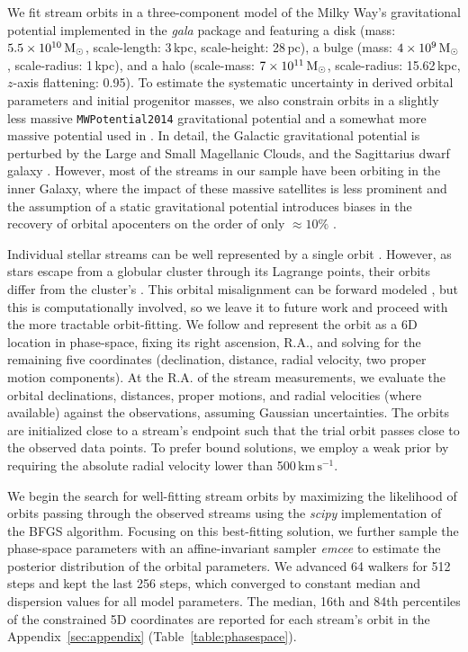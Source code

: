 \documentclass[twocolumn]{aastex63}
\newcommand{\package}[1]{\textsl{#1}}
\newcommand{\kms}{\ensuremath{\textrm{km}\,\textrm{s}^{-1}}}
\begin{document}
We fit stream orbits in a three-component model of the Milky Way's gravitational potential implemented in the \package{gala} package \citep{gala} and featuring a \citet{mn:1975} disk (mass: $5.5\times10^{10}\rm\, M_\odot$, scale-length: 3\,kpc, scale-height: 28\,pc), a \citet{hernquist:1990} bulge (mass: $4\times10^9\rm\, M_\odot$, scale-radius: 1\,kpc), and a \citet{nfw:1997} halo (scale-mass: $7\times10^{11}\rm\, M_\odot$, scale-radius: 15.62\,kpc, $z$-axis flattening: 0.95).
To estimate the systematic uncertainty in derived orbital parameters and initial progenitor masses, we also constrain orbits in a slightly less massive \texttt{MWPotential2014} gravitational potential \citep{bovy:2015} and a somewhat more massive potential used in \citet{pwb}.
In detail, the Galactic gravitational potential is perturbed by the Large and Small Magellanic Clouds, and the Sagittarius dwarf galaxy \citep{gomez:2015, erkal:2019, vasiliev:2020}.
However, most of the streams in our sample have been orbiting in the inner Galaxy, where the impact of these massive satellites is less prominent \citep{petersen:2020} and the assumption of a static gravitational potential introduces biases in the recovery of orbital apocenters on the order of only $\approx10\%$ \citep{garrow:2020}.


Individual stellar streams can be well represented by a single orbit \citep[e.g.,][]{koposov:2010, pwb, ibata:2019}.
However, as stars escape from a globular cluster through its Lagrange points, their orbits differ from the cluster's \citep{eyre:2011}.
This orbital misalignment can be forward modeled \citep{varghese:2011, bonaca:2014, sanders:2014}, but this is computationally involved, so we leave it to future work and proceed with the more tractable orbit-fitting.
We follow \citet{pwb} and represent the orbit as a 6D location in phase-space, fixing its right ascension, R.A., and solving for the remaining five coordinates (declination, distance, radial velocity, two proper motion components).
At the R.A. of the stream measurements, we evaluate the orbital declinations, distances, proper motions, and radial velocities (where available) against the observations, assuming Gaussian uncertainties.
The orbits are initialized close to a stream's endpoint such that the trial orbit passes close to the observed data points.
To prefer bound solutions, we employ a weak prior by requiring the absolute radial velocity lower than 500\,\kms.

We begin the search for well-fitting stream orbits by maximizing the likelihood of orbits passing through the observed streams using the \package{scipy} implementation of the BFGS algorithm.
Focusing on this best-fitting solution, we further sample the phase-space parameters with an affine-invariant sampler \package{emcee} to estimate the posterior distribution of the orbital parameters.
We advanced 64 walkers for 512 steps and kept the last 256 steps, which converged to constant median and dispersion values for all model parameters.
The median, 16th and 84th percentiles of the constrained 5D coordinates are reported for each stream's orbit in the Appendix~\ref{sec:appendix} (Table~\ref{table:phasespace}).
\end{document}
